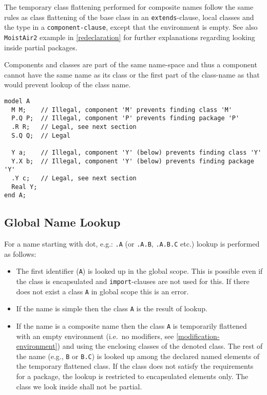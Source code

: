 \begin{nonnormative}
The temporary class flattening performed for composite names follow the same rules as class flattening of the base class in an \lstinline!extends!-clause, local classes and the type in a \lstinline[language=grammar]!component-clause!, except that the environment is empty.
See also \lstinline!MoistAir2! example in \cref{redeclaration} for further explanations regarding looking inside partial packages.
\end{nonnormative}
\begin{example}
Components and classes are part of the same name-space and thus a component cannot have the same name as its class or the first part of the class-name as that would prevent lookup of the class name.
\begin{lstlisting}[language=modelica]
model A
  M M;    // Illegal, component 'M' prevents finding class 'M'
  P.Q P;  // Illegal, component 'P' prevents finding package 'P'
  .R R;   // Legal, see next section
  S.Q Q;  // Legal

  Y a;    // Illegal, component 'Y' (below) prevents finding class 'Y'
  Y.X b;  // Illegal, component 'Y' (below) prevents finding package 'Y'
  .Y c;   // Legal, see next section
  Real Y;
end A;
\end{lstlisting}
\end{example}


\subsection{Global Name Lookup}\label{global-name-lookup}

For a name starting with dot, e.g.: \lstinline!.A! (or \lstinline!.A.B!, \lstinline!.A.B.C! etc.) lookup is performed as follows:
\begin{itemize}
\item
  The first identifier (\lstinline!A!) is looked up in the global scope.
  This is possible even if the class is encapsulated and \lstinline!import!-clauses are not used for this.
  If there does not exist a class \lstinline!A! in global scope this is an error.
\item
  If the name is simple then the class \lstinline!A! is the result of lookup.
\item
  If the name is a composite name then the class \lstinline!A! is temporarily flattened with an empty environment (i.e.\ no modifiers, see \cref{modification-environment}) and using the enclosing classes of the denoted class.
  The rest of the name (e.g., \lstinline!B! or \lstinline!B.C!) is looked up among the declared named elements of the temporary flattened class.
  If the class does not satisfy the requirements for a package, the lookup is restricted to encapsulated elements only.
  The class we look inside shall not be partial.
\end{itemize}

